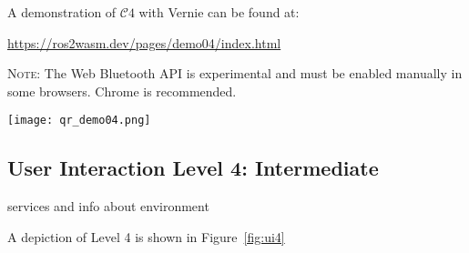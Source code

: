         \vspace{1em}
        \begin{tcolorbox}[title=Example 7]
            \begin{minipage}[t]{0.87\linewidth}
                \vspace*{0.5\baselineskip}
                A demonstration of $\mathcal{C}4$ with Vernie can be found at:
                
                \href{https://ros2wasm.dev/pages/demo04/index.html}{\textsf{https://ros2wasm.dev/pages/demo04/index.html}}

                \textsc{Note:} The Web Bluetooth \ac{API} is experimental and must be enabled manually in some browsers. Chrome is recommended.
            \end{minipage}\hfill%
            \begin{minipage}[t]{0.1\linewidth}
                \vspace{14pt}
                \texttt{[image: qr\_demo04.png]}
            \end{minipage}
        \end{tcolorbox}



        \subsection{User Interaction Level 4: Intermediate}

        services and info about environment









        A depiction of Level 4 is shown in Figure~\ref{fig:ui4}

